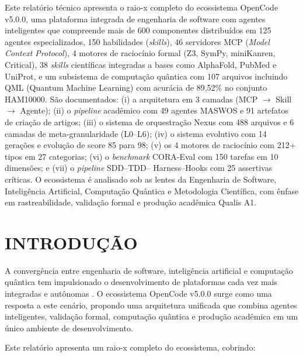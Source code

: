 \documentclass[
  brazil,
  sumario=tradicional,
  10pt
]{abntex2}
\begin{document}

\resumo
  Este relatório técnico apresenta o raio-x completo do ecossistema
  OpenCode v5.0.0, uma plataforma integrada de engenharia de software
  com agentes inteligentes que compreende mais de 600 componentes
  distribuídos em 125 agentes especializados, 150 habilidades (\textit{skills}),
  46 servidores MCP (\textit{Model Context Protocol}), 4 motores de
  raciocínio formal (Z3, SymPy, miniKanren, Critical), 38 \textit{skills}
  científicas integradas a bases como AlphaFold, PubMed e UniProt, e um
  subsistema de computação quântica com 107 arquivos incluindo QML
  (Quantum Machine Learning) com acurácia de 89,52\% no conjunto HAM10000.
  São documentados: (i) a arquitetura em 3 camadas (MCP $\rightarrow$
  Skill $\rightarrow$ Agente); (ii) o \textit{pipeline} acadêmico com
  49 agentes MASWOS e 91 artefatos de criação de artigos; (iii) o
  sistema de orquestração Nexus com 488 arquivos e 6 camadas de
  meta-granularidade (L0--L6); (iv) o sistema evolutivo com 14 gerações
  e evolução de score 85 para 98; (v) os 4 motores de raciocínio com
  212+ tipos em 27 categorias; (vi) o \textit{benchmark} CORA-Eval com
  150 tarefas em 10 dimensões; e (vii) o \textit{pipeline} SDD--TDD--
  Harness--Hooks com 25 assertivas críticas. O ecossistema é analisado
  sob as lentes da Engenharia de Software, Inteligência Artificial,
  Computação Quântica e Metodologia Científica, com ênfase em
  rastreabilidade, validação formal e produção acadêmica Qualis A1.
\endresumo

\section{INTRODUÇÃO}

A convergência entre engenharia de software, inteligência artificial e
computação quântica tem impulsionado o desenvolvimento de plataformas
cada vez mais integradas e autônomas \cite{sommerville2011engenharia,
pressman2016engenharia}. O ecossistema OpenCode v5.0.0 surge como uma
resposta a este cenário, propondo uma arquitetura unificada que combina
agentes inteligentes, validação formal, computação quântica e produção
acadêmica em um único ambiente de desenvolvimento.

Este relatório apresenta um raio-x completo do ecossistema, cobrindo:
\end{document}
